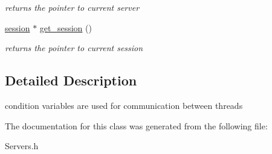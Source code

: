 \begin{DoxyCompactItemize}
\begin{DoxyCompactList}\small\item\em returns the pointer to current server \end{DoxyCompactList}\item 
\mbox{\label{classcond__var_a624ff85e7f2850661ec9c408ef1a7a26}} 
\hyperlink{classsession}{session} $\ast$ \hyperlink{classcond__var_a624ff85e7f2850661ec9c408ef1a7a26}{get\+\_\+session} ()
\begin{DoxyCompactList}\small\item\em returns the pointer to current session \end{DoxyCompactList}\end{DoxyCompactItemize}


\subsection{Detailed Description}
condition variables are used for communication between threads 

The documentation for this class was generated from the following file\+:\begin{DoxyCompactItemize}
\item 
Servers.\+h\end{DoxyCompactItemize}
